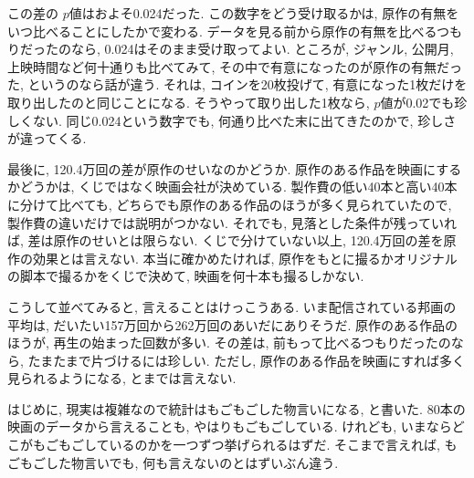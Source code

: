     この差の $p$値はおよそ0.024だった.
    この数字をどう受け取るかは, 原作の有無をいつ比べることにしたかで変わる.
    データを見る前から原作の有無を比べるつもりだったのなら, 0.024はそのまま受け取ってよい.
    ところが, ジャンル, 公開月, 上映時間など何十通りも比べてみて, その中で有意になったのが原作の有無だった, というのなら話が違う.
    それは, コインを20枚投げて, 有意になった1枚だけを取り出したのと同じことになる.
    そうやって取り出した1枚なら, $p$値が0.02でも珍しくない.
    同じ0.024という数字でも, 何通り比べた末に出てきたのかで, 珍しさが違ってくる.

    最後に, 120.4万回の差が原作のせいなのかどうか.
    原作のある作品を映画にするかどうかは, くじではなく映画会社が決めている.
    製作費の低い40本と高い40本に分けて比べても, どちらでも原作のある作品のほうが多く見られていたので, 製作費の違いだけでは説明がつかない.
    それでも, 見落とした条件が残っていれば, 差は原作のせいとは限らない.
    くじで分けていない以上, 120.4万回の差を原作の効果とは言えない.
    本当に確かめたければ, 原作をもとに撮るかオリジナルの脚本で撮るかをくじで決めて, 映画を何十本も撮るしかない.

    こうして並べてみると, 言えることはけっこうある.
    いま配信されている邦画の平均は, だいたい157万回から262万回のあいだにありそうだ.
    原作のある作品のほうが, 再生の始まった回数が多い.
    その差は, 前もって比べるつもりだったのなら, たまたまで片づけるには珍しい.
    ただし, 原作のある作品を映画にすれば多く見られるようになる, とまでは言えない.

    はじめに, 現実は複雑なので統計はもごもごした物言いになる, と書いた.
    80本の映画のデータから言えることも, やはりもごもごしている.
    けれども, いまならどこがもごもごしているのかを一つずつ挙げられるはずだ.
    そこまで言えれば, もごもごした物言いでも, 何も言えないのとはずいぶん違う.
